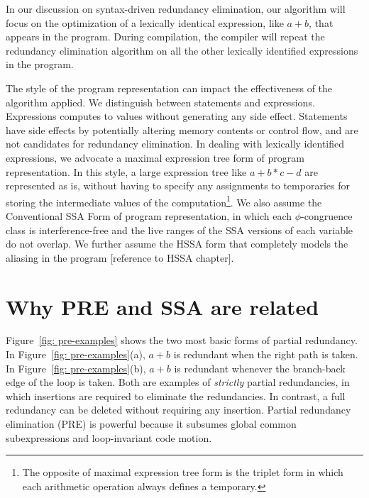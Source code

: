 In our discussion on syntax-driven redundancy elimination, our
algorithm will focus on the optimization of a lexically identical
expression, like $a+b$, that appears in the program.  During compilation,
the compiler will repeat the redundancy elimination algorithm on all the other 
lexically identified expressions in the program.

The style of the program representation can impact the effectiveness of the
algorithm applied.  We distinguish between statements and expressions.
Expressions computes to values without generating any side effect.  Statements
have side effects by potentially altering memory contents or control flow, and 
are not candidates for redundancy elimination.
In dealing with lexically identified expressions, we
advocate a maximal expression tree form of program representation.  In this
style, a large expression tree like $a+b*c-d$ are represented as is, without
having to specify any assignments to temporaries for storing the intermediate
values of the computation\footnote{The opposite of maximal expression tree form
is the triplet form in which each arithmetic operation always defines a 
temporary.}.  We also assume the Conventional SSA Form of
program representation, in which each $\phi$-congruence class is 
interference-free and the live ranges of the SSA versions of each variable
do not overlap. We further assume the HSSA form that completely models the
aliasing in the program [reference to HSSA chapter].

\section{Why PRE and SSA are related}
\label{section:Part3:Pre_not_helped:PRErelatedtoSSA}

Figure~\ref{fig: pre-examples} shows the two most basic forms of partial
redundancy.  In Figure~\ref{fig: pre-examples}(a), $a+b$ is redundant when 
the right path is taken.
In Figure~\ref{fig: pre-examples}(b), $a+b$ is redundant whenever the 
branch-back edge of the loop is taken.  Both are examples of \emph{strictly}
partial redundancies, in which insertions are required to eliminate the
redundancies.  In contrast, a full redundancy can be deleted without requiring 
any insertion.  Partial redundancy elimination (PRE) is powerful because it
subsumes global common subexpressions and loop-invariant code motion.


